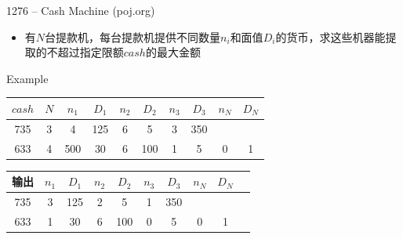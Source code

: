 \begin{frame}{1276 -- Cash Machine (poj.org)}
    \begin{itemize}
        \item 有$N$台提款机，每台提款机提供不同数量$n_i$和面值$D_i$的货币，求这些机器能提取的不超过指定限额$cash$的最大金额
    \end{itemize}
    \vfill
    \begin{exampleblock}{Example}
        \begin{table}
            \begin{tabular}{cccccccccc}
                $cash$ & $N$    & $n_1$   & $D_1$   & $n_2$   & $D_2$   & $n_3$   & $D_3$   & $n_N$   & $D_N$  \\\hline
                735  & 3    & 4    & 125  & 6    & 5    & 3    & 350  &      &    \\\hline
                633  & 4    & 500  & 30   & 6    & 100  & 1    & 5    & 0    & 1  \\\hline
            \end{tabular}
        \end{table}
        \begin{table}
            \begin{tabular}{cccccccccc}
                输出 & $n_1$   & $D_1$   & $n_2$   & $D_2$   & $n_3$   & $D_3$   & $n_N$   & $D_N$  \\\hline
                735  & 3  & 125  & 2    & 5    & 1    & 350  &      &    \\\hline
                633  & 1  & 30   & 6    & 100  & 0    & 5    & 0    & 1  \\\hline
            \end{tabular}
        \end{table}  
    \end{exampleblock}
\end{frame}  
